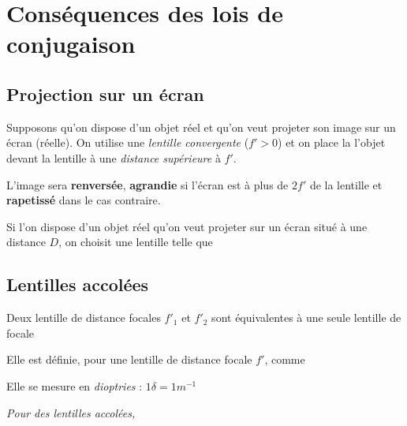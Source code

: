 \documentclass[11pt]{article}
\theoremstyle{cstyle}{\newtheorem{definition}{Définition}[section]}
\theoremstyle{cstyle}{\newtheorem{proposition}[definition]{Propriété}}
\theoremstyle{cstyle}{\newtheorem{theorem}[definition]{Théorème}}
\theoremstyle{mystyle}{\newtheorem{lemma}[definition]{Lemme}}
\theoremstyle{mystyle}{\newtheorem{corollary}[definition]{Corollaire}}
\theoremstyle{mystyle}{\newtheorem*{remark}{Remarque}}
\theoremstyle{mystyle}{\newtheorem*{remarks}{Remarques}}
\theoremstyle{mystyle}{\newtheorem*{example}{Exemple}}
\theoremstyle{mystyle}{\newtheorem*{examples}{Exemples}}
\theoremstyle{definition}{\newtheorem*{exercise}{Exercice}}
\theoremstyle{mystyle}{\newtheorem*{methode}{Méthode}}
\theoremstyle{cstyle}{\newtheorem*{cthm}{}}
\theoremstyle{warn}
\begin{document}
	\begin{minipage}[t]{0.46\textwidth}
		\section{Conséquences des lois de conjugaison}
		
		\subsection{Projection sur un écran}
		
		\begin{proposition}
			Supposons qu'on dispose d'un objet réel et qu'on veut projeter son image sur un écran (réelle). On utilise une \textit{lentille convergente} (\(f' > 0\)) et on place la l'objet devant la lentille à une \textit{distance supérieure} à \(f'\).
			
			L'image sera \textbf{renversée}, \textbf{agrandie} si l'écran est à plus de \(2f'\) de la lentille et \textbf{rapetissé} dans le cas contraire.
		\end{proposition}		
	
		\begin{proposition}
			Si l'on dispose d'un objet réel qu'on veut projeter sur un écran situé à une distance \(D\), on choisit une lentille telle que 
		\end{proposition}
	
		\subsection{Lentilles accolées}
		
		\begin{proposition}
			Deux lentille de distance focales \(f'_{1}\) et \(f'_2\) sont équivalentes à une seule lentille de focale 
		\end{proposition}
		
		\begin{definition}
			Elle est définie, pour une lentille de distance focale \(f'\), comme 
			
			Elle se mesure en \textit{dioptries} : \(1 \delta = 1m^{-1}\)
			
			\textit{Pour des lentilles accolées, }
		\end{definition}
	\end{minipage}
\end{document}

